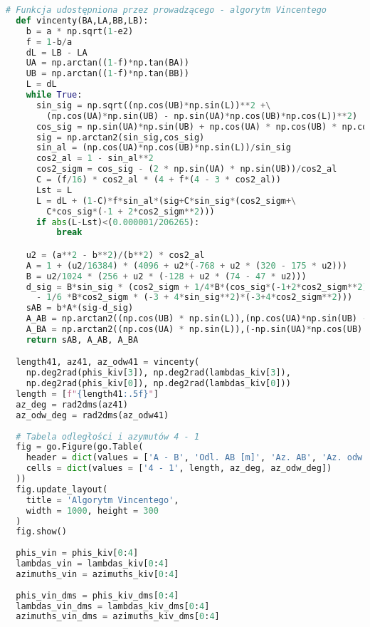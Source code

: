 \documentclass[fleqn,10pt,a4paper]{article}
\begin{document}
\newpage
\begin{lstlisting}[language=Python, caption = Algortym Vincentego, label = kod:vincenty, style = mycode]
  # Funkcja udostępniona przez prowadzącego - algorytm Vincentego
  def vincenty(BA,LA,BB,LB):
    b = a * np.sqrt(1-e2)
    f = 1-b/a
    dL = LB - LA
    UA = np.arctan((1-f)*np.tan(BA))
    UB = np.arctan((1-f)*np.tan(BB))
    L = dL
    while True:
      sin_sig = np.sqrt((np.cos(UB)*np.sin(L))**2 +\
        (np.cos(UA)*np.sin(UB) - np.sin(UA)*np.cos(UB)*np.cos(L))**2)
      cos_sig = np.sin(UA)*np.sin(UB) + np.cos(UA) * np.cos(UB) * np.cos(L)
      sig = np.arctan2(sin_sig,cos_sig)
      sin_al = (np.cos(UA)*np.cos(UB)*np.sin(L))/sin_sig
      cos2_al = 1 - sin_al**2
      cos2_sigm = cos_sig - (2 * np.sin(UA) * np.sin(UB))/cos2_al
      C = (f/16) * cos2_al * (4 + f*(4 - 3 * cos2_al))
      Lst = L
      L = dL + (1-C)*f*sin_al*(sig+C*sin_sig*(cos2_sigm+\
        C*cos_sig*(-1 + 2*cos2_sigm**2)))
      if abs(L-Lst)<(0.000001/206265):
          break

    u2 = (a**2 - b**2)/(b**2) * cos2_al
    A = 1 + (u2/16384) * (4096 + u2*(-768 + u2 * (320 - 175 * u2)))
    B = u2/1024 * (256 + u2 * (-128 + u2 * (74 - 47 * u2)))
    d_sig = B*sin_sig * (cos2_sigm + 1/4*B*(cos_sig*(-1+2*cos2_sigm**2)\
      - 1/6 *B*cos2_sigm * (-3 + 4*sin_sig**2)*(-3+4*cos2_sigm**2)))
    sAB = b*A*(sig-d_sig)
    A_AB = np.arctan2((np.cos(UB) * np.sin(L)),(np.cos(UA)*np.sin(UB) - np.sin(UA)*np.cos(UB)*np.cos(L)))
    A_BA = np.arctan2((np.cos(UA) * np.sin(L)),(-np.sin(UA)*np.cos(UB) + np.cos(UA)*np.sin(UB)*np.cos(L))) + np.pi
    return sAB, A_AB, A_BA

  length41, az41, az_odw41 = vincenty(
    np.deg2rad(phis_kiv[3]), np.deg2rad(lambdas_kiv[3]), 
    np.deg2rad(phis_kiv[0]), np.deg2rad(lambdas_kiv[0]))
  length = [f"{length41:.5f}"]
  az_deg = rad2dms(az41)
  az_odw_deg = rad2dms(az_odw41)
  
  # Tabela odległości i azymutów 4 - 1
  fig = go.Figure(go.Table(
    header = dict(values = ['A - B', 'Odl. AB [m]', 'Az. AB', 'Az. odw. AB']), 
    cells = dict(values = ['4 - 1', length, az_deg, az_odw_deg])
  ))
  fig.update_layout(
    title = 'Algorytm Vincentego', 
    width = 1000, height = 300
  )
  fig.show()
  
  phis_vin = phis_kiv[0:4]
  lambdas_vin = lambdas_kiv[0:4]
  azimuths_vin = azimuths_kiv[0:4]
  
  phis_vin_dms = phis_kiv_dms[0:4]
  lambdas_vin_dms = lambdas_kiv_dms[0:4]
  azimuths_vin_dms = azimuths_kiv_dms[0:4]
  

\end{lstlisting}
\end{document}
